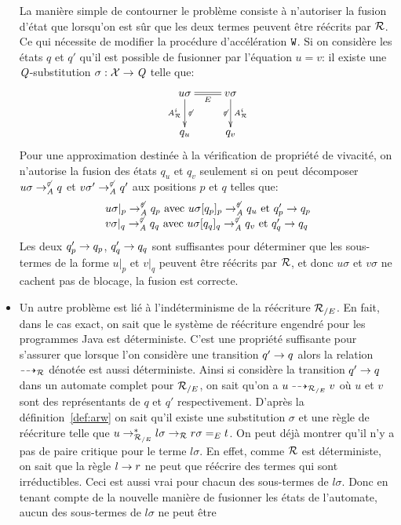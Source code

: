 \begin{itemize}
  La manière simple de contourner le problème consiste à n'autoriser la fusion d'état que lorsqu'on est
  sûr que les deux termes peuvent être réécrits par $\mathcal R$. Ce qui nécessite de modifier la procédure d'accélération
  $\mathtt{W}$. Si on considère les états $q$ et $q'$ qu'il est possible
  de fusionner par l'équation $u = v$:
  il existe une $\mathit Q$-substitution $\sigma : \mathcal X \rightarrow\mathit Q$ telle que:
   \[\xymatrix{
     u\sigma \ar@{=}[r]_{E}\ar[d]_{\aaex^i}^{\not\varepsilon} & v\sigma \ar[d]_{\not\varepsilon}^{\aaex^i}\\
     q_u & q_v
   } \]
   Pour une approximation destinée à la vérification de propriété de vivacité, on n'autorise la fusion
   des états $q_u$ et $q_v$ seulement si on peut décomposer
   $u\sigma \rightarrow^{\not\varepsilon}_\mathit A q$ et $v\sigma' \rightarrow^{\not\varepsilon}_\mathit A q'$ aux positions $p$ et $q$ telles que:
   \[\begin{array}{l}
     u\sigma|_p \rightarrow^{\not\varepsilon}_\mathit A q_p \textrm{ avec } u\sigma[q_p]_p \rightarrow^{\not\varepsilon}_\mathit A q_u \textrm{ et } q'_p \rightarrow q_p\\ 
     v\sigma|_q \rightarrow^{\not\varepsilon}_\mathit A q_q \textrm{ avec } u\sigma[q_q]_q \rightarrow^{\not\varepsilon}_\mathit A q_v \textrm{ et } q'_q \rightarrow q_q
   \end{array}\]
   Les deux $q'_p \rightarrow q_p$, $q'_q \rightarrow q_q$ sont suffisantes pour déterminer que les sous-termes de la forme $u|_p$
   et $v|_q$ peuvent être réécrits par $\mathcal R$, et donc $u\sigma$ et $v\sigma$ ne cachent pas de blocage, la fusion
   est correcte.
 \item
   Un autre problème est lié à l'indéterminisme de la réécriture ${\mathcal R_{/E}}$. En fait, dans le cas
   exact, on sait que le système de réécriture engendré pour les programmes Java est déterministe.
   C'est une propriété suffisante pour s'assurer que lorsque l'on considère une transition $q' \rightarrow q$
   alors la relation $\dashrightarrow_{\mathcal R}$ dénotée est aussi déterministe.
   Ainsi si considère la transition $q' \rightarrow q$ dans un automate complet pour ${\mathcal R_{/E}}$, on sait
   qu'on a $u \dashrightarrow_{{\mathcal R_{/E}}} v$ où $u$ et $v$ sont des représentants de $q$ et $q'$ respectivement.
   D'après la définition~\ref{def:arw} on sait qu'il existe une substitution $\sigma$ et une règle
   de réécriture telle que $u \rightarrow_{{\mathcal R_{/E}}}^* l\sigma \rightarrow_\mathcal R r\sigma =_E t$. On peut déjà montrer
   qu'il n'y a pas de paire critique pour le terme $l\sigma$. En effet, comme $\mathcal R$ est déterministe,
   on sait que la règle $l\rightarrow r$ ne peut que réécrire des termes qui sont irréductibles.
   Ceci est aussi vrai pour chacun des sous-termes de $l\sigma$. Donc en tenant compte de la nouvelle
   manière de fusionner les états de l'automate, aucun des sous-termes de $l\sigma$ ne peut être

\end{itemize}
